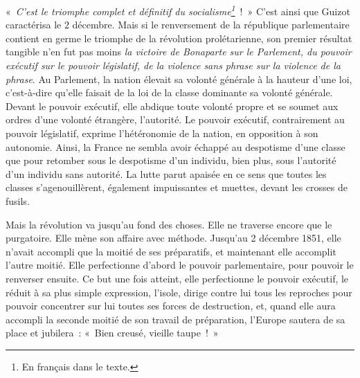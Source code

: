 \documentclass[french,twoside]{book} %
\begin{document}
« \emph{C’est le triomphe complet et définitif du socialisme\footnote{En français dans le texte.}} ! » C’est ainsi que Guizot caractérisa le 2 décembre. Mais si le renversement de la république parlementaire contient en germe le triomphe de la révolution prolétarienne, son premier résultat tangible n’en fut pas moins \emph{la victoire de Bonaparte sur le Parlement, du pouvoir exécutif sur le pouvoir législatif, de la violence sans phrase sur la violence de la phrase}. Au Parlement, la nation élevait sa volonté générale à la hauteur d’une loi, c’est-à-dire qu’elle faisait de la loi de la classe dominante sa volonté générale. Devant le pouvoir exécutif, elle abdique toute volonté propre et se soumet aux ordres d’une volonté étrangère, l’autorité. Le pouvoir exécutif, contrairement au pouvoir législatif, exprime l’hétéronomie de la nation, en opposition à son autonomie. Ainsi, la France ne sembla avoir échappé au despotisme d’une classe que pour retomber sous le despotisme d’un individu, bien plus, sous l’autorité d’un individu sans autorité. La lutte parut apaisée en ce sens que toutes les classes s’agenouillèrent, également impuissantes et muettes, devant les crosses de fusils.\par
Mais la révolution va jusqu’au fond des choses. Elle ne traverse encore que le purgatoire. Elle mène son affaire avec méthode. Jusqu’au 2 décembre 1851, elle n’avait accompli que la moitié de ses préparatifs, et maintenant elle accomplit l’autre moitié. Elle perfectionne d’abord le pouvoir parlementaire, pour pouvoir le renverser ensuite. Ce but une fois atteint, elle perfectionne le pouvoir exécutif, le réduit à sa plus simple expression, l’isole, dirige contre lui tous les reproches pour pouvoir concentrer sur lui toutes ses forces de destruction, et, quand elle aura accompli la seconde moitié de son travail de préparation, l’Europe sautera de sa place et jubilera : « Bien creusé, vieille taupe ! »\par
\end{document}
